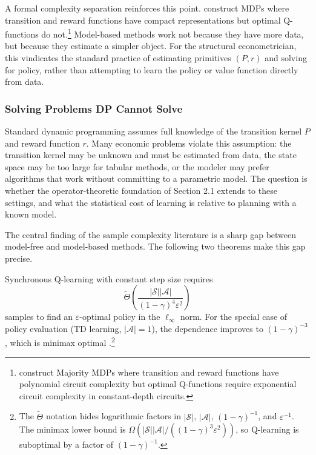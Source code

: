 A formal complexity separation reinforces this point. \citet{zhu2024representation} construct MDPs where transition and reward functions have compact representations but optimal Q-functions do not.\footnote{\citet{zhu2024representation} construct Majority MDPs where transition and reward functions have polynomial circuit complexity but optimal Q-functions require exponential circuit complexity in constant-depth circuits.} Model-based methods work not because they have more data, but because they estimate a simpler object. For the structural econometrician, this vindicates the standard practice of estimating primitives $(P, r)$ and solving for policy, rather than attempting to learn the policy or value function directly from data.

\subsubsection{Solving Problems DP Cannot Solve}

Standard dynamic programming assumes full knowledge of the transition kernel $P$ and reward function $r$. Many economic problems violate this assumption: the transition kernel may be unknown and must be estimated from data, the state space may be too large for tabular methods, or the modeler may prefer algorithms that work without committing to a parametric model. The question is whether the operator-theoretic foundation of Section 2.1 extends to these settings, and what the statistical cost of learning is relative to planning with a known model.

The central finding of the sample complexity literature is a sharp gap between model-free and model-based methods. The following two theorems make this gap precise.

\begin{theorem}
\label{thm:q_learning_sample}
Synchronous Q-learning with constant step size requires
\[
\tilde{\Theta}\!\left(\frac{|\mathcal{S}||\mathcal{A}|}{(1-\gamma)^4 \varepsilon^2}\right)
\]
samples to find an $\varepsilon$-optimal policy in the $\ell_\infty$ norm. For the special case of policy evaluation (TD learning, $|\mathcal{A}|=1$), the dependence improves to $(1-\gamma)^{-3}$, which is minimax optimal \citep{li2024minimax}.\footnote{The $\tilde{\Theta}$ notation hides logarithmic factors in $|\mathcal{S}|$, $|\mathcal{A}|$, $(1-\gamma)^{-1}$, and $\varepsilon^{-1}$. The minimax lower bound is $\Omega(|\mathcal{S}||\mathcal{A}|/((1-\gamma)^3\varepsilon^2))$, so Q-learning is suboptimal by a factor of $(1-\gamma)^{-1}$.}
\end{theorem}

